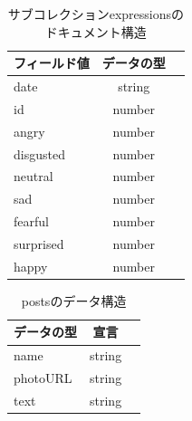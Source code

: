 \clearpage

\begin{table}[hbtp]
  \caption{サブコレクションexpressionsのドキュメント構造}
  \label{table:data_type}
  \centering
  \begin{tabular}{|l|c|r|}\hline
    フィールド値  & データの型 \\\hline 
    date  & string  \\
    id  & number  \\
    angry  & number  \\
    disgusted  &  number  \\
    neutral  &  number  \\
    sad  &  number  \\
    fearful  &  number  \\
    surprised  &  number  \\
    happy  &  number  \\\hline
  \end{tabular}
\end{table}

\begin{table}[hbtp]
  \caption{postsのデータ構造}
  \label{table:data_type}
  \centering
  \begin{tabular}{|l|c|r|} \hline
    データの型  & 宣言   \\ \hline 
    name  & string  \\
    photoURL  & string  \\
    text  &  string \\ \hline
  \end{tabular}
\end{table}
